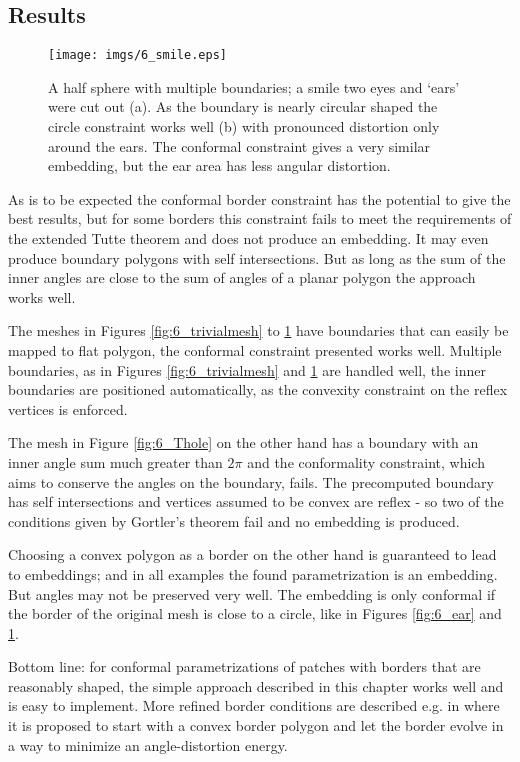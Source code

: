 \subsection{Results}


\begin{figure}%
\texttt{[image: imgs/6\_smile.eps]}%
\caption{A half sphere with multiple boundaries; a smile two eyes and `ears' were cut out (a). As the boundary is nearly circular shaped the circle constraint works well (b) with pronounced distortion only around the ears. The conformal constraint gives a very similar embedding, but the ear area has less angular distortion.}
\label{fig:6_smile}
\end{figure}

As is to be expected the conformal border constraint has the potential to give the best results, but for some borders this constraint fails to meet the requirements of the extended Tutte theorem and does not produce an embedding. It may even produce boundary polygons with self intersections. But as long as the sum of the inner angles are close to the sum of angles of a planar polygon the approach works well. 

The meshes in Figures \ref{fig:6_trivialmesh} to \ref{fig:6_smile} have boundaries that can easily be mapped to flat polygon, the conformal constraint presented works well. Multiple boundaries, as in Figures \ref{fig:6_trivialmesh} and \ref{fig:6_smile} are handled well, the inner boundaries are positioned automatically, as the convexity constraint on the reflex vertices is enforced.

The mesh in Figure \ref{fig:6_Thole} on the other hand has a boundary with an inner angle sum much greater than $2\pi$ and the conformality constraint, which aims to conserve the angles on the boundary, fails. The precomputed boundary has self intersections and vertices assumed to be convex are reflex - so two of the conditions given by Gortler's theorem fail and no embedding is produced.

Choosing a convex polygon as a border on the other hand is guaranteed to lead to embeddings; and in all examples the found parametrization is an embedding. But angles may not be preserved very well. The embedding is only conformal if the border of the original mesh is close to a circle, like in Figures \ref{fig:6_ear} and \ref{fig:6_smile}.

Bottom line: for conformal parametrizations of patches with borders that are reasonably shaped, the simple approach described in this chapter works well and is easy to implement. More refined border conditions are described e.g. in \cite{meshpar1} where it is proposed to start with a convex border polygon and let the border evolve in a way to minimize an angle-distortion energy. 


